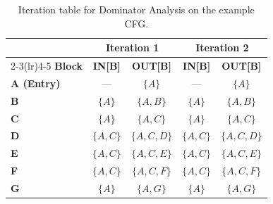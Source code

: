 \begin{table}[H]
\centering
\renewcommand{\arraystretch}{1.6}
\begin{tabular}{l cc cc}
\toprule
 & \multicolumn{2}{c}{\textbf{Iteration 1}}
 & \multicolumn{2}{c}{\textbf{Iteration 2}} \\
\cmidrule(lr){2-3}\cmidrule(lr){4-5}
\textbf{Block} & \textbf{IN[B]} & \textbf{OUT[B]}
               & \textbf{IN[B]} & \textbf{OUT[B]} \\
\midrule
\textbf{A (Entry)}
    & ---           & $\{A\}$       & ---           & $\{A\}$ \\
\textbf{B}
    & $\{A\}$       & $\{A,B\}$     & $\{A\}$       & $\{A,B\}$ \\
\textbf{C}
    & $\{A\}$       & $\{A,C\}$     & $\{A\}$       & $\{A,C\}$ \\
\textbf{D}
    & $\{A,C\}$     & $\{A,C,D\}$   & $\{A,C\}$     & $\{A,C,D\}$ \\
\textbf{E}
    & $\{A,C\}$     & $\{A,C,E\}$   & $\{A,C\}$     & $\{A,C,E\}$ \\
\textbf{F}
    & $\{A,C\}$     & $\{A,C,F\}$   & $\{A,C\}$     & $\{A,C,F\}$ \\
\textbf{G}
    & $\{A\}$       & $\{A,G\}$     & $\{A\}$       & $\{A,G\}$ \\
\bottomrule
\end{tabular}
\caption{Iteration table for Dominator Analysis on the example CFG.}
\end{table}
